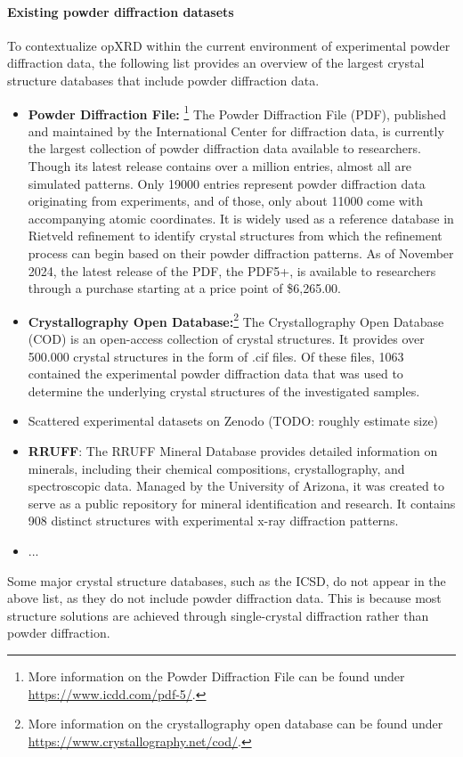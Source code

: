 

\paragraph{Existing powder diffraction datasets} To contextualize opXRD within the current environment of experimental powder diffraction data, the following list provides an overview of the largest crystal structure databases that include powder diffraction data. 

\begin{itemize}
\item \textbf{Powder Diffraction File:} \footnote{More information on the Powder Diffraction File can be found under \url{https://www.icdd.com/pdf-5/}.} The Powder Diffraction File (PDF), published and maintained by the International Center for diffraction data, is currently the largest collection of powder diffraction data available to researchers. Though its latest release contains over a million entries, almost all are simulated patterns. Only 19000 entries represent powder diffraction data originating from experiments, and of those, only about 11000 come with accompanying atomic coordinates. It is widely used as a reference database in Rietveld refinement to identify crystal structures from which the refinement process can begin based on their powder diffraction patterns. As of November 2024, the latest release of the PDF, the PDF5+, is available to researchers through a purchase starting at a price point of \$6,265.00.

\item \textbf{Crystallography Open Database:}\footnote{More information on the crystallography open database can be found under \url{https://www.crystallography.net/cod/}.} The Crystallography Open Database (COD)\cite{Graulis2009cod} is an open-access collection of crystal structures. It provides over 500.000 crystal structures in the form of .cif files. Of these files, 1063 contained the experimental powder diffraction data that was used to determine the underlying crystal structures of the investigated samples.

\item Scattered experimental datasets on Zenodo (TODO: roughly estimate size)
\item \textbf{RRUFF}: The RRUFF Mineral Database \cite{Armbruster2015} provides detailed information on minerals, including their chemical compositions, crystallography, and spectroscopic data. Managed by the University of Arizona, it was created to serve as a public repository for mineral identification and research. It contains \num{908} distinct structures with experimental x-ray diffraction patterns.
\item ...
\end{itemize}

Some major crystal structure databases, such as the ICSD, do not appear in the above list, as they do not include powder diffraction data. This is because most structure solutions are achieved through single-crystal diffraction rather than powder diffraction.
 

